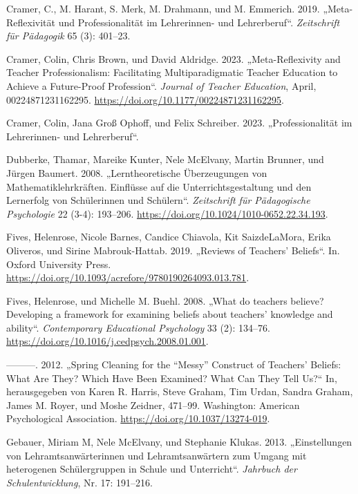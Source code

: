\documentclass[
  letterpaper,
  DIV=11]{scrartcl}
\newlength{\cslhangindent}
\newenvironment{CSLReferences}[2] %
 {\begin{list}{}{%
  \setlength{\itemindent}{0pt}
  \setlength{\leftmargin}{0pt}
  \setlength{\parsep}{0pt}
  \ifodd #1
   \setlength{\leftmargin}{\cslhangindent}
   \setlength{\itemindent}{-1\cslhangindent}
  \fi
  \setlength{\itemsep}{#2\baselineskip}}}
 {\end{list}}
\begin{document}
\begin{CSLReferences}{1}{0}
Cramer, C., M. Harant, S. Merk, M. Drahmann, und M. Emmerich. 2019.
{„Meta-Reflexivität und Professionalität im Lehrerinnen- und
Lehrerberuf``}. \emph{Zeitschrift für Pädagogik} 65 (3): 401--23.

Cramer, Colin, Chris Brown, und David Aldridge. 2023. {„Meta-Reflexivity
and Teacher Professionalism: Facilitating Multiparadigmatic Teacher
Education to Achieve a Future-Proof Profession``}. \emph{Journal of
Teacher Education}, April, 00224871231162295.
\url{https://doi.org/10.1177/00224871231162295}.

Cramer, Colin, Jana Groß Ophoff, und Felix Schreiber. 2023.
{„Professionalität im Lehrerinnen- und Lehrerberuf``}.

Dubberke, Thamar, Mareike Kunter, Nele McElvany, Martin Brunner, und
Jürgen Baumert. 2008. {„Lerntheoretische Überzeugungen von
Mathematiklehrkräften. Einflüsse auf die Unterrichtsgestaltung und den
Lernerfolg von Schülerinnen und Schülern``}. \emph{Zeitschrift für
Pädagogische Psychologie} 22 (3-4): 193--206.
\url{https://doi.org/10.1024/1010-0652.22.34.193}.

Fives, Helenrose, Nicole Barnes, Candice Chiavola, Kit SaizdeLaMora,
Erika Oliveros, und Sirine Mabrouk-Hattab. 2019. {„Reviews of
Teachers{'} Beliefs``}. In. Oxford University Press.
\url{https://doi.org/10.1093/acrefore/9780190264093.013.781}.

Fives, Helenrose, und Michelle M. Buehl. 2008. {„What do teachers
believe? Developing a framework for examining beliefs about teachers'
knowledge and ability``}. \emph{Contemporary Educational Psychology} 33
(2): 134--76. \url{https://doi.org/10.1016/j.cedpsych.2008.01.001}.

---------. 2012. {„Spring Cleaning for the {``}Messy{''} Construct of
Teachers{'} Beliefs: What Are They? Which Have Been Examined? What Can
They Tell Us?``} In, herausgegeben von Karen R. Harris, Steve Graham,
Tim Urdan, Sandra Graham, James M. Royer, und Moshe Zeidner, 471--99.
Washington: American Psychological Association.
\url{https://doi.org/10.1037/13274-019}.

Gebauer, Miriam M, Nele McElvany, und Stephanie Klukas. 2013.
{„Einstellungen von Lehramtsanwärterinnen und Lehramtsanwärtern zum
Umgang mit heterogenen Schülergruppen in Schule und Unterricht``}.
\emph{Jahrbuch der Schulentwicklung}, Nr. 17: 191--216.


\end{CSLReferences}
\end{document}
